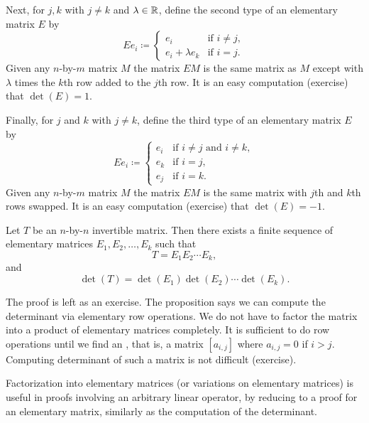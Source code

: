 Next, for $j,k$ with $j\neq k$ and $\lambda \in {\mathbb{R}}$,
define the second type of an elementary matrix $E$ by
\begin{equation*}
Ee_i \coloneqq 
\begin{cases}
e_i               & \text{if } i \neq j , \\
e_i + \lambda e_k & \text{if } i = j .
\end{cases}
\end{equation*}
Given any $n$-by-$m$ matrix $M$ the matrix $EM$ is the same matrix as $M$
except with $\lambda$ times the $k$th row added to the $j$th row.
It is an easy computation (exercise) that $\det(E) = 1$.

Finally, for $j$ and $k$ with $j\neq k$, define
the third type of an elementary matrix $E$ by
\begin{equation*}
Ee_i \coloneqq 
\begin{cases}
e_i & \text{if } i \neq j \text{ and } i \neq k , \\
e_k & \text{if } i = j , \\
e_j & \text{if } i = k .
\end{cases}
\end{equation*}
Given any $n$-by-$m$ matrix $M$ the matrix $EM$ is the same matrix with
$j$th and $k$th rows swapped.
It is an easy computation (exercise) that $\det(E) = -1$.

\begin{prop} \label{prop:elemmatrixdecomp}
Let $T$ be an $n$-by-$n$ invertible matrix.  Then there exists a finite
sequence of elementary matrices $E_1, E_2, \ldots, E_k$ such that
\begin{equation*}
T = E_1 E_2 \cdots E_k ,
\end{equation*}
and
\begin{equation*}
\det(T) = \det(E_1)\det(E_2)\cdots \det(E_k) .
\end{equation*}
\end{prop}

The proof is left as an exercise.
The proposition says we can compute the determinant via elementary row operations.
We do not have to factor the matrix into a product of
elementary matrices completely.  It is sufficient to do row operations
until we find an \emph{}, that is, a matrix
$[a_{i,j}]$ where $a_{i,j} = 0$ if $i > j$.  Computing determinant of such a
matrix is not difficult (exercise).

Factorization into elementary matrices (or variations on elementary
matrices) is useful in proofs involving an arbitrary linear operator, by
reducing to a proof for an elementary matrix, similarly as the computation
of the determinant.



